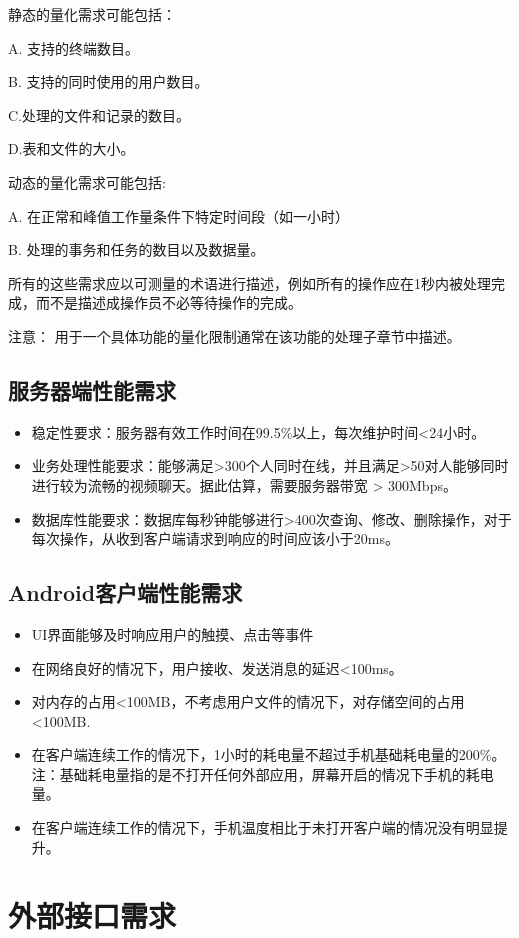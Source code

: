 静态的量化需求可能包括：

A. 支持的终端数目。

B. 支持的同时使用的用户数目。

C.处理的文件和记录的数目。

D.表和文件的大小。

动态的量化需求可能包括:

A. 在正常和峰值工作量条件下特定时间段（如一小时）

B. 处理的事务和任务的数目以及数据量。

所有的这些需求应以可测量的术语进行描述，例如所有的操作应在1秒内被处理完成，而不是描述成操作员不必等待操作的完成。

注意： 用于一个具体功能的量化限制通常在该功能的处理子章节中描述。
\fi
\subsection{服务器端性能需求}
\begin{itemize}
	\item 稳定性要求：服务器有效工作时间在99.5\%以上，每次维护时间<24小时。
	\item 业务处理性能要求：能够满足>300个人同时在线，并且满足>50对人能够同时进行较为流畅的视频聊天。据此估算，需要服务器带宽 > 300Mbps。
	\item 数据库性能要求：数据库每秒钟能够进行>400次查询、修改、删除操作，对于每次操作，从收到客户端请求到响应的时间应该小于20ms。
\end{itemize}
\subsection{Android客户端性能需求}
\begin{itemize}
	\item UI界面能够及时响应用户的触摸、点击等事件
	\item 在网络良好的情况下，用户接收、发送消息的延迟<100ms。
	\item 对内存的占用<100MB，不考虑用户文件的情况下，对存储空间的占用<100MB.
	\item 在客户端连续工作的情况下，1小时的耗电量不超过手机基础耗电量的200\%。注：基础耗电量指的是不打开任何外部应用，屏幕开启的情况下手机的耗电量。
	\item 在客户端连续工作的情况下，手机温度相比于未打开客户端的情况没有明显提升。
\end{itemize}
\section{外部接口需求}
